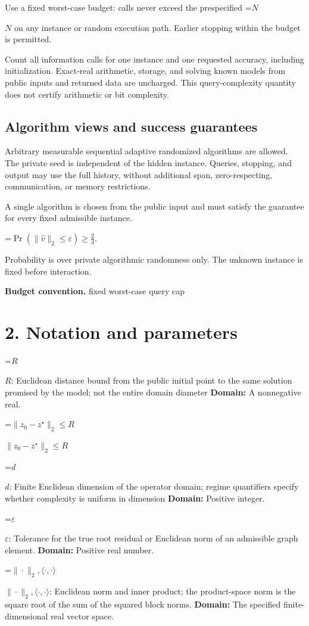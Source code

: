 \documentclass[10pt,a4paper]{article}
\newcommand{\AtlasMath}[1]{\par\begingroup\centering\setbox0=\hbox{$\displaystyle #1$}\ifdim\wd0>1.4\linewidth\typeout{ATLAS WIDE FORMULA: \the\wd0}\fi\ifdim\wd0>\linewidth\resizebox{\linewidth}{!}{\box0}\else\box0\fi\par\endgroup}
\newcommand{\AtlasInlineMath}[1]{\begingroup\setbox0=\hbox{$#1$}\ifdim\wd0>.4\linewidth\endgroup\AtlasMath{#1}\else\endgroup$#1$\fi}
\begin{document}
Use a fixed worst-case budget: calls never exceed the prespecified \AtlasInlineMath{N} on any instance or random execution path. Earlier stopping within the budget is permitted.

Count all information calls for one instance and one requested accuracy, including initialization. Exact-real arithmetic, storage, and solving known models from public inputs and returned data are uncharged. This query-complexity quantity does not certify arithmetic or bit complexity.

\subsection{Algorithm views and success guarantees}
Arbitrary measurable sequential adaptive randomized algorithms are allowed. The private seed is independent of the hidden instance. Queries, stopping, and output may use the full history, without additional span, zero-respecting, communication, or memory restrictions.

A single algorithm is chosen from the public input and must satisfy the guarantee for every fixed admissible instance.


\AtlasMath{\Pr\!\left(\|\widehat{v}\|_2\le\varepsilon\right)\ge\frac23.}


Probability is over private algorithmic randomness only. The unknown instance is fixed before interaction.

\textbf{Budget convention.} fixed worst-case query cap

\section{2. Notation and parameters}
\AtlasInlineMath{R}: Euclidean distance bound from the public initial point to the same solution promised by the model; not the entire domain diameter \textbf{Domain:} A nonnegative real.

\AtlasInlineMath{\|z_0-z^\star\|_2\le R}

\AtlasInlineMath{d}: Finite Euclidean dimension of the operator domain; regime quantifiers specify whether complexity is uniform in dimension \textbf{Domain:} Positive integer.

\AtlasInlineMath{\varepsilon}: Tolerance for the true root residual or Euclidean norm of an admissible graph element. \textbf{Domain:} Positive real number.

\AtlasInlineMath{\|\cdot\|_2,\langle\cdot,\cdot\rangle}: Euclidean norm and inner product; the product-space norm is the square root of the sum of the squared block norms. \textbf{Domain:} The specified finite-dimensional real vector space.
\end{document}
